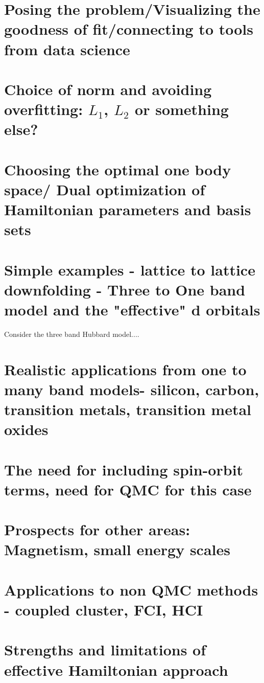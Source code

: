 \documentclass[prl,12pt,onecolumn,nofootinbib,notitlepage,english,superscriptaddress]{revtex4-1}
\begin{document}
\section{Posing the problem/Visualizing the goodness of fit/connecting to tools from data science}

\section{Choice of norm and avoiding overfitting: $L_1$, $L_2$ or something else?}

\section{Choosing the optimal one body space/ Dual optimization of Hamiltonian parameters and basis sets}

\section{Simple examples - lattice to lattice downfolding - Three to One band model and the "effective" d orbitals}
Consider the three band Hubbard model.... 

\section{Realistic applications from one to many band models- silicon, carbon, transition metals, transition metal oxides}

\section{The need for including spin-orbit terms, need for QMC for this case}

\section{Prospects for other areas: Magnetism, small energy scales}

\section{Applications to non QMC methods - coupled cluster, FCI, HCI}

\section{Strengths and limitations of effective Hamiltonian approach}
\end{document}
